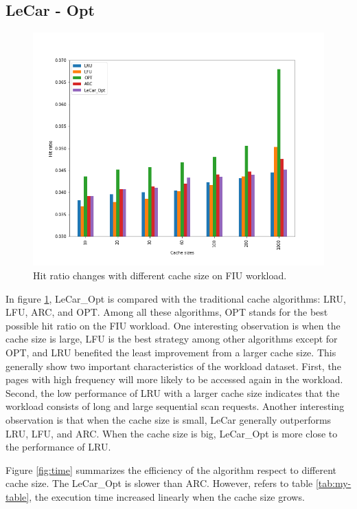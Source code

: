 \documentclass[letterpaper,twocolumn,10pt]{article}
\begin{document}
\subsection{LeCar - Opt}
\begin{figure}[!ht]
	\centering 
	\includegraphics[width=0.38\textheight]{hitratio_bar.png}
	\caption{Hit ratio changes with different cache size on FIU workload.
}
	\label{fig:lecar_res}
\end{figure}
In figure \ref{fig:lecar_res}, LeCar\_Opt is compared with the traditional cache algorithms: LRU, LFU, ARC, and OPT. Among all these algorithms, OPT stands for the best possible hit ratio on the FIU workload. One interesting observation is when the cache size is large, LFU is the best strategy among other algorithms except for OPT, and LRU benefited the least improvement from a larger cache size. This generally show two important characteristics of the workload dataset. First, the pages with high frequency will more likely to be accessed again in the workload. Second, the low performance of LRU with a larger cache size indicates that the workload consists of long and large sequential scan requests. Another interesting observation is that when the cache size is small, LeCar generally outperforms LRU, LFU, and ARC. When the cache size is big, LeCar\_Opt is more close to the performance of LRU. 

Figure \ref{fig:time} summarizes the efficiency of the algorithm respect to different cache size. The LeCar\_Opt is slower than ARC. However, refers to table \ref{tab:my-table}, the execution time increased linearly when the cache size grows.
\end{document}
